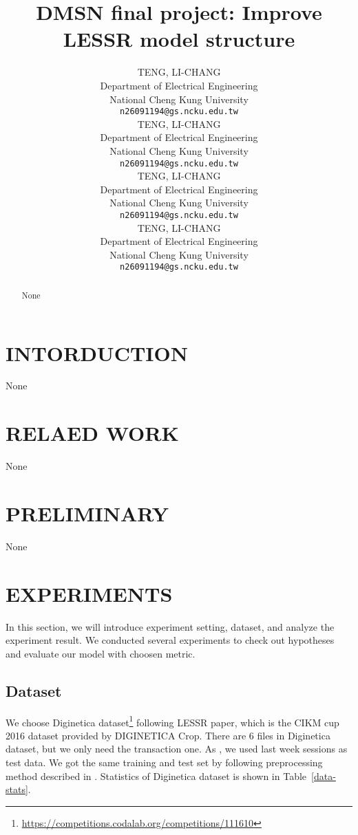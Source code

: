 \documentclass{article}
\title{DMSN final project: Improve LESSR model structure}
\author{%
  TENG, LI-CHANG\\
  Department of Electrical Engineering\\
  National Cheng Kung University\\
  \texttt{n26091194@gs.ncku.edu.tw} \\
  \And
  TENG, LI-CHANG\\
  Department of Electrical Engineering\\
  National Cheng Kung University\\
  \texttt{n26091194@gs.ncku.edu.tw} \\
  \AND
  TENG, LI-CHANG\\
  Department of Electrical Engineering\\
  National Cheng Kung University\\
  \texttt{n26091194@gs.ncku.edu.tw} \\
  \And
  TENG, LI-CHANG\\
  Department of Electrical Engineering\\
  National Cheng Kung University\\
  \texttt{n26091194@gs.ncku.edu.tw} \\
}
\begin{document}
\maketitle


\begin{abstract}
    None
    \vspace{2cm}
\end{abstract}


\section{INTORDUCTION}
None
\vspace{3cm}


\section{RELAED WORK}
None
\vspace{3cm}


\section{PRELIMINARY}
None
\vspace{3cm}



\section{EXPERIMENTS}

In this section, we will introduce experiment setting,
dataset, and analyze the experiment result.
We conducted several experiments to check out hypotheses and evaluate our
model with choosen metric.

\subsection{Dataset}

We choose Diginetica dataset\footnote{\url{https://competitions.codalab.org/competitions/111610}}
following LESSR \cite{chen2020lessr} paper,
which is the CIKM cup 2016 dataset provided by DIGINETICA Crop.
There are 6 files in Diginetica dataset, but we only need the transaction one.
As \cite{chen2020lessr}, we used last week sessions as test data.
We got the same training and test set by following preprocessing method
described in \cite{chen2020lessr}.
Statistics of Diginetica dataset is shown in Table~\ref{data-stats}.
\end{document}

